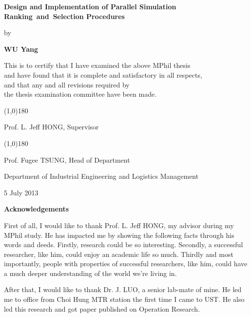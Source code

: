 \documentclass[12pt,a4paper]{report}
\begin{document}
\newpage

\null\vspace{1.0cm}
\begin{center}
{\Large\bf Design and Implementation of Parallel Simulation Ranking~and~Selection Procedures}
\vspace{1.5cm}

{\large by}\smallskip

{\large\bf WU Yang}\normalsize

\vspace{1cm}

This is to certify that I have examined the above MPhil thesis \\
and have found that it is complete and satisfactory in all respects, \\
and that any and all revisions required by \\
the thesis examination committee have been made.

\vspace{2.0cm}

\line(1,0){180} \smallskip

Prof. L. Jeff HONG, Supervisor
\vspace{1.5cm}

\line(1,0){180} \smallskip

Prof. Fugee TSUNG, Head of Department
\medskip

Department of Industrial Engineering and Logistics Management\medskip

5 July 2013
\end{center}

\newpage

\begin{center}{\Large\bf Acknowledgements}\normalsize
\end{center}
\vspace{0.5cm}

First of all, I would like to thank Prof. L. Jeff HONG, my advisor during my MPhil study. He has impacted me by showing the following facts through his words and deeds. Firstly, research could be so interesting. Secondly, a successful researcher, like him, could enjoy an academic life so much. Thirdly and most importantly, people with properties of successful researchers, like him, could have a much deeper understanding of the world we're living in.

After that, I would like to thank Dr. J. LUO, a senior lab-mate of mine. He led me to office from Choi Hung MTR station the first time I came to UST. He also led this research and got paper published on Operation Research.
\end{document}
